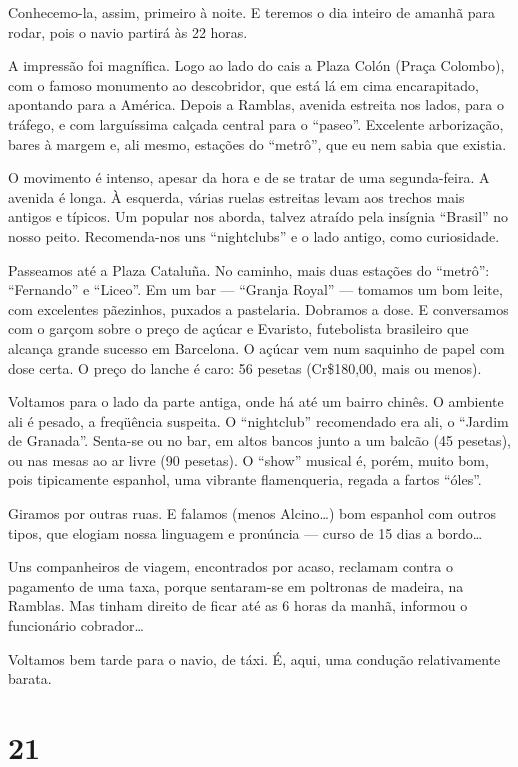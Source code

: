 Conhecemo-la, assim, primeiro à noite. E teremos o dia inteiro de amanhã para rodar, pois o navio partirá às 22 horas.

A impressão foi magnífica. Logo ao lado do cais a Plaza Colón (Praça Colombo), com o famoso monumento ao descobridor, que está lá em cima encarapitado, apontando para a América. Depois a Ramblas, avenida estreita nos lados, para o tráfego, e com larguíssima calçada central para o ``paseo''. Excelente arborização, bares à margem e, ali mesmo, estações do ``metrô'', que eu nem sabia que existia.

O movimento é intenso, apesar da hora e de se tratar de uma segunda-feira. A avenida é longa. À esquerda, várias ruelas estreitas levam aos trechos mais antigos e típicos. Um popular nos aborda, talvez atraído pela insígnia ``Brasil'' no nosso peito. Recomenda-nos uns ``nightclubs'' e o lado antigo, como curiosidade.

Passeamos até a Plaza Cataluña. No caminho, mais duas estações do ``metrô'': ``Fernando'' e ``Liceo''. Em um bar --- ``Granja Royal'' --- tomamos um bom leite, com excelentes pãezinhos, puxados a pastelaria. Dobramos a dose. E conversamos com o garçom sobre o preço de açúcar e Evaristo, futebolista brasileiro que alcança grande sucesso em Barcelona. O açúcar vem num saquinho de papel com dose certa. O preço do lanche é caro: 56 pesetas (Cr\$180,00, mais ou menos).

Voltamos para o lado da parte antiga, onde há até um bairro chinês. O ambiente ali é pesado, a freqüência suspeita. O ``nightclub'' recomendado era ali, o ``Jardim de Granada''. Senta-se ou no bar, em altos bancos junto a um balcão (45 pesetas), ou nas mesas ao ar livre (90 pesetas). O ``show'' musical é, porém, muito bom, pois tipicamente espanhol, uma vibrante flamenqueria, regada a fartos ``óles''.

Giramos por outras ruas. E falamos (menos Alcino\ldots) bom espanhol com outros tipos, que elogiam nossa linguagem e pronúncia --- curso de 15 dias a bordo\ldots

Uns companheiros de viagem, encontrados por acaso, reclamam contra o pagamento de uma taxa, porque sentaram-se em poltronas de madeira, na Ramblas. Mas tinham direito de ficar até as 6 horas da manhã, informou o funcionário cobrador\ldots

Voltamos bem tarde para o navio, de táxi. É, aqui, uma condução relativamente barata.

\section*{21 \adfflatleafright {}}

